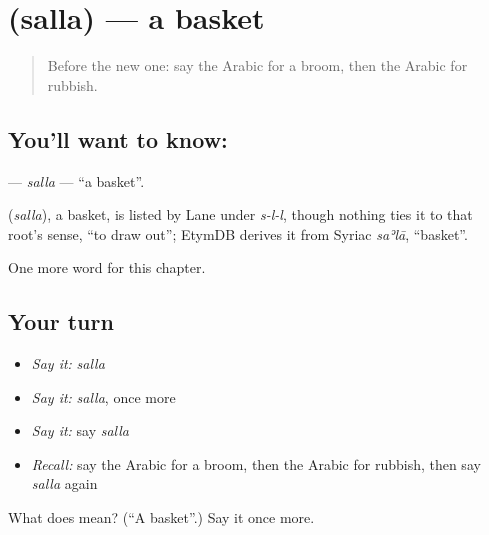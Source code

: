 \section[\texorpdfstring{\ar{سلة} (salla)}{سلة (salla)}]{ (salla) — a basket}

\label{lesson:AR-C125-salla}



\begin{quote}
Before the new one: say the Arabic for a broom, then the Arabic for rubbish.
\end{quote}

\subsection*{You'll want to know: }
\textbf{} — \emph{salla} — \textquotedblleft{}a basket\textquotedblright{}.

\begin{cousinweb}
\textbf{} (\emph{salla}), a basket, is listed by Lane under \emph{s-l-l}, though nothing ties it to that root's sense, \textquotedblleft{}to draw out\textquotedblright{}; EtymDB derives it from Syriac \emph{saʾlā}, \textquotedblleft{}basket\textquotedblright{}.
\end{cousinweb}

\begin{grammarlens}[title={What you've built}]
One more word for this chapter.
\end{grammarlens}

\subsection*{Your turn}
\begin{itemize}
\raggedright
  \item \emph{Say it:} \emph{salla}
  \item \emph{Say it:} \emph{salla}, once more
  \item \emph{Say it:} say \emph{salla}
  \item \emph{Recall:} say the Arabic for a broom, then the Arabic for rubbish, then say \emph{salla} again
\end{itemize}

\begin{tcolorbox}[breakable,colback=teal!4,colframe=teal!35!black,title={Before you move on}]
What does  mean? (\textquotedblleft{}A basket\textquotedblright{}.) Say it once more.
\end{tcolorbox}
